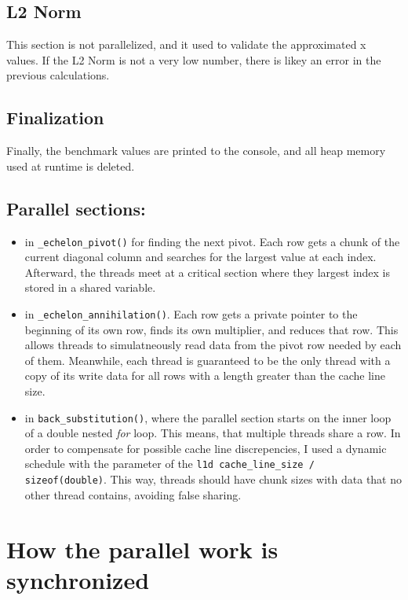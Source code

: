 \documentclass[a4paper,12pt]{article}
\begin{document}
    \subsection*{L2 Norm}
    This section is not parallelized, and it used to validate the approximated
    x values. If the L2 Norm is not a very low number, there is likey an error
    in the previous calculations.

    \subsection*{Finalization}
    Finally, the benchmark values are printed to the console, and all heap
    memory used at runtime is deleted.

    \subsection*{Parallel sections:}
    \begin{itemize}
    \item in \texttt{\_echelon\_pivot()} for finding the next pivot. Each row gets
          a chunk of the current diagonal column and searches for the largest value
          at each index. Afterward, the threads meet at a critical section where
          they largest index is stored in a shared variable.
    \item in \texttt{\_echelon\_annihilation()}. Each row gets a private pointer to the beginning
          of its own row, finds its own multiplier, and reduces that row. This
          allows threads to simulatneously read data from the pivot row needed by each of
          them. Meanwhile, each thread is guaranteed to be the only thread with
          a copy of its write data for all rows with a length greater than the
          cache line size.
    \item in \texttt{back\_substitution()}, where the parallel section starts on the inner
    loop of a double nested \emph{for} loop. This means, that multiple threads share a row.
    In order to compensate for possible cache line discrepencies, I used a dynamic schedule with
    the parameter of the \texttt{l1d cache\_line\_size / sizeof(double)}. This way, threads should
    have chunk sizes with data that no other thread contains, avoiding false sharing.
    \end{itemize}


\section{How the parallel work is synchronized}
\end{document}
